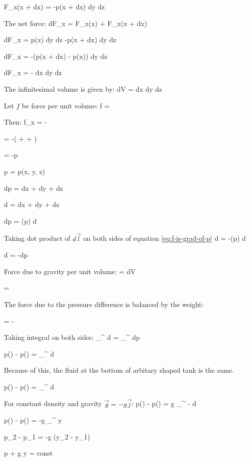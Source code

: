 	\eqb
		F_x(x + dx) = -p(x + dx) dy dz
	\eqe
	
	The net force:
	\eqb
		dF_x = F_x(x) + F_x(x + dx)
	\eqe
	
	\eqb
		dF_x = p(x) dy dz  -p(x + dx) dy dz
	\eqe
	
	\eqb
		dF_x = -(p(x + dx) - p(x)) dy dz
	\eqe
	
	\eqb
		dF_x = - dx dy dz
	\eqe
	
	The infinitesimal volume is given by:
	\eqb
		dV = dx dy dz
	\eqe
	
	Let $f$ be force per unit volume:
	\eqb
		f = 
	\eqe
	
	Then:
	\eqb
		f_x = -
	\eqe
	
	\eqb
		 = -\left( 
		  
			+  
			+  
			\right)
	\eqe
	
	\eqb \label{eq:f-is-grad-of-p}
		 = -\nabla p
	\eqe
	
	\eqb
		p = p(x, y, z)
	\eqe
	
	\eqb
		dp =  dx
			+  dy
			+  dz
	\eqe
	
	\eqb
		d = dx  + dy  + dz 
	\eqe
	
	\eqb
		dp = (\nabla p) \cdot d
	\eqe
	
	Taking dot product of $d\vec{l}$ on both sides of equation \ref{eq:f-is-grad-of-p}
	\eqb
		 \cdot d = -(\nabla p) \cdot d 
	\eqe
	
	\eqb
		 \cdot d = -dp 
	\eqe
	
	Force due to gravity per unit volume:
	\eqb
		 = \rho dV 
	\eqe
	
	\eqb
		 = \rho  {}
	\eqe
	
	The force due to the pressure difference is balanced by the weight:
	
	\eqb
		 = -
	\eqe
	

	Taking integral on both sides:
	\eqb
		\int_{}^{}  \cdot d
			= \int_{}^{} dp 
	\eqe
	
	\eqb
		p() - p() = \int_{}^{}  \cdot d
	\eqe
	
	Because of this, the fluid at the bottom of arbitary shaped tank is the same.
	
	\eqb
		p() - p() = \int_{}^{} \rho {} \cdot d
	\eqe
	
	For constant density and gravity $\vec{g} = -g\vec{j}$:
	\eqb
		p() - p() = \rho g \int_{}^{} - \cdot d
	\eqe
	
	\eqb
		p() - p() = -\rho g \int_{}^{} y
	\eqe
	
	\eqb
		p_2 - p_1 = -\rho g (y_2 - y_1)
	\eqe
	
	\eqb
		p + \rho g y = const
	\eqe
	
	
